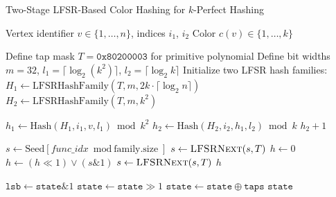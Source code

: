 \documentclass{article}
\begin{document}
\begin{algorithm}
    \caption{Two-Stage LFSR-Based Color Hashing for $k$-Perfect Hashing}
    \begin{algorithmic}[1]
        \Require Vertex identifier \( v \in \{1, \dots, n\} \), indices \( i_1 \), \( i_2 \)
        \Ensure Color \( c(v) \in \{1, \dots, k\} \)

        \State Define tap mask \( T = \texttt{0x80200003} \) for primitive polynomial
        \State Define bit widths \( m = 32 \), \( l_1 = \lceil \log_2 (k^2) \rceil \), \( l_2 = \lceil \log_2 k \rceil \)
        \State Initialize two LFSR hash families:
        \Statex \quad \( H_1 \gets \text{LFSRHashFamily}(T, m, 2k \cdot \lceil \log_2 n \rceil) \)
        \Statex \quad \( H_2 \gets \text{LFSRHashFamily}(T, m, k^2) \)

        \State \( h_1 \gets \text{Hash}(H_1, i_1, v, l_1) \bmod k^2 \)
        \State \( h_2 \gets \text{Hash}(H_2, i_2, h_1, l_2) \bmod k \)
        \State \Return \( h_2 + 1 \)
        \EndFunction

        \State \( s \gets \text{Seed}[func\_idx \bmod \text{family.size}] \)
        \State \( s \gets \textsc{LFSRNext}(s, T) \)
        \EndFor
        \State \( h \gets 0 \)
        \State \( h \gets (h \ll 1) \lor (s \& 1) \)
        \State \( s \gets \textsc{LFSRNext}(s, T) \)
        \EndFor
        \State \Return \( h \)
        \EndFunction

        \State \( \texttt{lsb} \gets \texttt{state} \& 1 \)
        \State \( \texttt{state} \gets \texttt{state} \gg 1 \)
        \State \( \texttt{state} \gets \texttt{state} \oplus \texttt{taps} \)
        \EndIf
        \State \Return \( \texttt{state} \)
        \EndFunction

    \end{algorithmic}
\end{algorithm}

\end{document}
